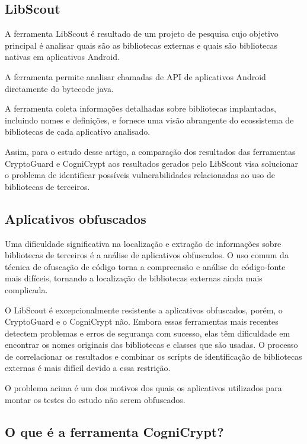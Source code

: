 \subsection{LibScout} %

A ferramenta LibScout é resultado de um projeto de pesquisa cujo objetivo principal é analisar quais são as bibliotecas externas e quais são bibliotecas nativas em aplicativos Android. 

A ferramenta permite analisar chamadas de API de aplicativos Android diretamente do bytecode java. 

A ferramenta coleta informações detalhadas sobre bibliotecas implantadas, incluindo nomes e definições, e fornece uma visão abrangente do ecossistema de bibliotecas de cada aplicativo analisado. \cite{LibScout}

Assim, para o estudo desse artigo, a comparação dos resultados das ferramentas CryptoGuard e CogniCrypt aos resultados gerados pelo LibScout visa solucionar o problema de identificar possíveis vulnerabilidades relacionadas ao uso de bibliotecas de terceiros.

\subsection{Aplicativos obfuscados} %

Uma dificuldade significativa na localização e extração de informações sobre bibliotecas de terceiros é a análise de aplicativos obfuscados. O uso comum da técnica de ofuscação de código torna a compreensão e análise do código-fonte mais difíceis, tornando a localização de bibliotecas externas ainda mais complicada. \cite{api_tpl_zhang}

O LibScout é excepcionalmente resistente a aplicativos obfuscados, porém, o CryptoGuard e o CogniCrypt não. Embora essas ferramentas mais recentes detectem problemas e erros de segurança com sucesso, elas têm dificuldade em encontrar os nomes originais das bibliotecas e classes que são usadas. O processo de correlacionar os resultados e combinar os scripts de identificação de bibliotecas externas é mais difícil devido a essa restrição.

O problema acima é um dos motivos dos quais os aplicativos utilizados para montar os testes do estudo não serem obfuscados.

\subsection{O que é a ferramenta CogniCrypt?} %

